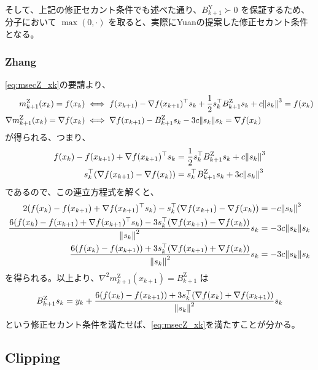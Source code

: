 \documentclass[a4paper, 10pt, dvipdfmx,draft]{article}
\begin{document}
そして、上記の修正セカント条件でも述べた通り、$B^\mathrm{Y}_{k+1} \succ 0$ を保証するため、分子において $\max(0, \cdot)$ を取ると、実際にYuanの提案した修正セカント条件となる。

\subsubsection{Zhang}
\label{subsubsec:zhang}

\cref{eq:msecZ_xk}の要請より、
\begin{align*}
    m^\mathrm{Z}_{k+1}(x_k) = f(x_k)
     & \iff f(x_{k+1})- \nabla f(x_{k+1})^\top s_k + \frac12 s_k^\top B^\mathrm{Z}_{k+1} s_k + c\norm{s_k}^3 = f(x_k) \\
    \nabla m^\mathrm{Z}_{k+1}(x_k) = \nabla f(x_k)
     & \iff \nabla f(x_{k+1})- B^\mathrm{Z}_{k+1} s_k - 3c\norm{s_k} s_k = \nabla f(x_k)
\end{align*}
が得られる、つまり、
\begin{align*}
    f(x_k) - f(x_{k+1})+ \nabla f(x_{k+1})^\top s_k & = \frac12 s_k^\top B^\mathrm{Z}_{k+1} s_k + c \norm{s_k}^3 \\
    s_k^\top (\nabla f(x_{k+1})-\nabla f(x_k))      & = s_k^\top B^\mathrm{Z}_{k+1} s_k + 3c \norm{s_k}^3
\end{align*}
であるので、この連立方程式を解くと、
\begin{align*}
    2(f(x_k)-f(x_{k+1})+\nabla f(x_{k+1})^\top s_k) - s_k^\top (\nabla f(x_{k+1})-\nabla f(x_k))                            & = -c \norm{s_k}^3    \\
    \frac{6(f(x_k)-f(x_{k+1})+\nabla f(x_{k+1})^\top s_k) - 3 s_k^\top (\nabla f(x_{k+1})-\nabla f(x_k))}{\norm{s_k}^2} s_k & = -3c \norm{s_k} s_k \\
    \frac{6(f(x_k)-f(x_{k+1})) + 3 s_k^\top (\nabla f(x_{k+1})+\nabla f(x_k))}{\norm{s_k}^2} s_k                            & = -3c \norm{s_k} s_k
\end{align*}
を得られる。以上より、$\nabla^2 m^\mathrm{Z}_{k+1}(x_{k+1}) = B^\mathrm{Z}_{k+1}$ は
\begin{equation*}
    B^\mathrm{Z}_{k+1}s_k = y_k + \frac{6(f(x_k)-f(x_{k+1})) + 3 s_k^\top (\nabla f(x_k)+\nabla f(x_{k+1}))}{\norm{s_k}^2} s_k
\end{equation*}
という修正セカント条件を満たせば、\cref{eq:msecZ_xk}を満たすことが分かる。

\subsection{Clipping}
\end{document}
